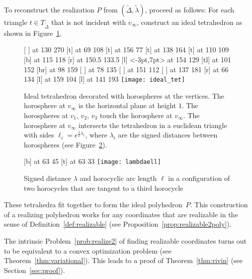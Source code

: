 \documentclass[a4paper, 11pt]{article}
\newcommand{\Deltil}{\widetilde{\Delta}}
\newcommand{\lamtil}{\tilde{\lambda}}
\theoremstyle{plain}
\theoremstyle{definition}
\begin{document}
To reconstruct the realization $P$ from $(\Deltil,\lamtil)$, proceed
as follows: For each triangle $t\in T_{\Deltil}$ that is not incident
with $v_{\infty}$, construct an ideal tetrahedron as shown in
Figure~\ref{fig:idealtet}.
\begin{figure}
  \small\hair 2pt
   [ ] at 130 270
   [t] at 69 108
   [t] at 156 77
   [t] at 138 164
   [t] at 110 109
   [b] at 115 118
   [r] at 150.5 133.5
   [l] <-3pt,7pt> at 154 129
   [tl] at 101 152
   [br] at 98 159
   [ ] at 78 135
   [ ] at 151 112
   [ ] at 137 181
   [r] at 66 134
   [l] at 159 104
   [l] at 141 193
  \endlabellist
  \centering
  \texttt{[image: ideal\_tet]}
  \caption{Ideal tetrahedron decorated with horospheres at the
    vertices. The horosphere at $v_{\infty}$ is the horizontal plane at height
    $1$. The horospheres at $v_{1}$, $v_{2}$, $v_{3}$ touch the
    horosphere at $v_{\infty}$. The horosphere at $v_{\infty}$
    intersects the tetrahedron in a euclidean triangle with sides
    $\ell_{i}=e^{\frac{1}{2}\lambda_{i}}$, where $\lambda_{i}$ are
    the signed distances between horospheres (see Figure~\ref{fig:lambdaell}). 
  }
  \label{fig:idealtet}
\end{figure}
\begin{figure}
  \small\hair 2pt
   [b] at 63 45
  \pinlabel {$\lambda$} [t] at 63 33
  \endlabellist
  \centering
  \texttt{[image: lambdaell]}
  \caption{Signed distance $\lambda$ and horocyclic arc length
    $\ell$ in a configuration of two horocycles that are tangent to a
    third horocycle}
  \label{fig:lambdaell}
\end{figure}
These tetrahedra fit together to form the ideal polyhedron~$P$. This
construction of a realizing polyhedron works for any coordinates that
are realizable in the sense of Definition~\ref{def:realizable}
(see Proposition~\ref{prop:realizable2poly}).

The intrinsic Problem~\ref{prob:realize2} of finding realizable
coordinates turns out to be equivalent to a convex optimization
problem (see Theorem~\ref{thm:variational}). This leads to a proof of
Theorem~\ref{thm:rivin} (see Section~\ref{sec:proof}).
\end{document}

